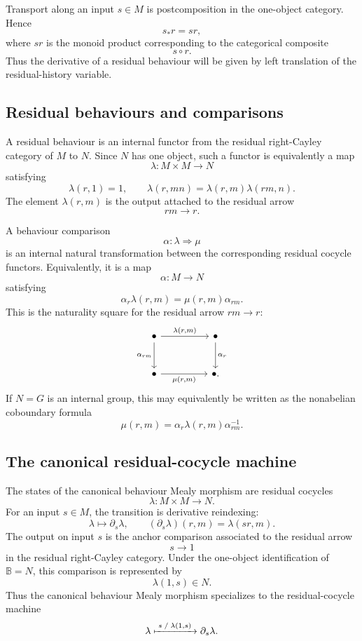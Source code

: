 Transport along an input \(s\in M\) is postcomposition in the one-object
category. Hence
\[
    s_*r=sr,
\]
where \(sr\) is the monoid product corresponding to the categorical composite
\[
    s\circ r.
\]
Thus the derivative of a residual behaviour will be given by left translation
of the residual-history variable.

\subsection{Residual behaviours and comparisons}
\label{subsec:one-object-residual-behaviours}

A residual behaviour is an internal functor from the residual right-Cayley
category of \(M\) to \(N\). Since \(N\) has one object, such a functor is
equivalently a map
\[
    \lambda:M\times M\to N
\]
satisfying
\[
    \lambda(r,1)=1,
    \qquad
    \lambda(r,mn)=\lambda(r,m)\lambda(rm,n).
\]
The element \(\lambda(r,m)\) is the output attached to the residual arrow
\[
    rm\longrightarrow r.
\]

A behaviour comparison
\[
    \alpha:\lambda\Rightarrow\mu
\]
is an internal natural transformation between the corresponding residual
cocycle functors. Equivalently, it is a map
\[
    \alpha:M\to N
\]
satisfying
\[
    \alpha_r\lambda(r,m)=\mu(r,m)\alpha_{rm}.
\]
This is the naturality square for the residual arrow \(rm\to r\):
\[
    \begin{tikzcd}[column sep=huge, row sep=large]
            \bullet
                \arrow[r, "{\lambda(r,m)}"]
                \arrow[d, "{\alpha_{rm}}"']
        &
            \bullet
                \arrow[d, "{\alpha_r}"]
        \\
            \bullet
                \arrow[r, "{\mu(r,m)}"']
        &
            \bullet .
    \end{tikzcd}
\]
If \(N=G\) is an internal group, this may equivalently be written as the
nonabelian coboundary formula
\[
    \mu(r,m)=\alpha_r\lambda(r,m)\alpha_{rm}^{-1}.
\]

\subsection{The canonical residual-cocycle machine}
\label{subsec:one-object-canonical-behaviour-machine}

The states of the canonical behaviour Mealy morphism are residual cocycles
\[
    \lambda:M\times M\to N.
\]
For an input \(s\in M\), the transition is derivative reindexing:
\[
    \lambda\longmapsto \partial_s\lambda,
    \qquad
    (\partial_s\lambda)(r,m)=\lambda(sr,m).
\]
The output on input \(s\) is the anchor comparison associated to the residual
arrow
\[
    s\longrightarrow 1
\]
in the residual right-Cayley category. Under the one-object identification of
\(\mathbb B=N\), this comparison is represented by
\[
    \lambda(1,s)\in N.
\]
Thus the canonical behaviour Mealy morphism specializes to the residual-cocycle
machine
\[
    \lambda
        \xmapsto{\;s\;/\;\lambda(1,s)\;}
    \partial_s\lambda .
\]

